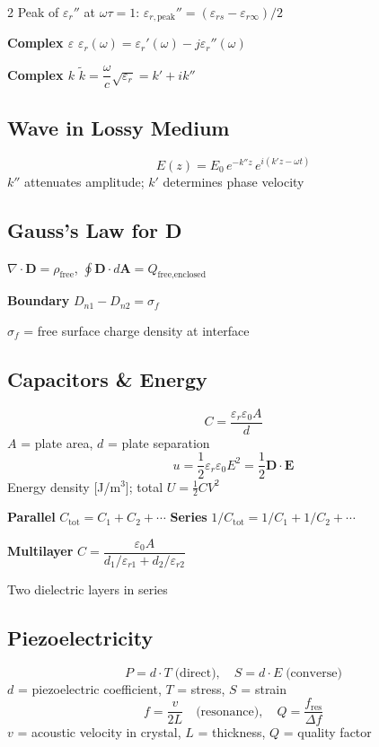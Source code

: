 \documentclass[9pt]{extarticle}
\newcommand{\eqlabel}[1]{\textbf{\scriptsize #1}\;}
\newcommand{\desc}[1]{{\small\color{desc}#1}}
\begin{document}
\begin{multicols}{2}
\desc{Peak of $\varepsilon_r''$ at $\omega\tau = 1$: \; $\varepsilon_{r,\text{peak}}'' = (\varepsilon_{rs}-\varepsilon_{r\infty})/2$}

\eqlabel{Complex $\varepsilon$} $\varepsilon_r(\omega) = \varepsilon_r'(\omega) - j\varepsilon_r''(\omega)$

\eqlabel{Complex $k$} $\tilde{k} = \dfrac{\omega}{c}\sqrt{\varepsilon_r} = k' + ik''$

\subsection{Wave in Lossy Medium}
\[E(z) = E_0\,e^{-k''z}\,e^{i(k'z-\omega t)}\]
\desc{$k''$ attenuates amplitude; $k'$ determines phase velocity}

\subsection{Gauss's Law for D}
$\nabla\cdot\mathbf{D} = \rho_{\text{free}}$, \quad $\displaystyle\oint\mathbf{D}\cdot d\mathbf{A} = Q_{\text{free,enclosed}}$

\eqlabel{Boundary} $D_{n1} - D_{n2} = \sigma_f$

\desc{$\sigma_f$ = free surface charge density at interface}

\subsection{Capacitors \& Energy}
\[C = \frac{\varepsilon_r\varepsilon_0 A}{d}\]
\desc{$A$ = plate area, $d$ = plate separation}
\[u = \frac{1}{2}\varepsilon_r\varepsilon_0 E^2 = \frac{1}{2}\mathbf{D}\cdot\mathbf{E}\]
\desc{Energy density [J/m$^3$]; total $U = \tfrac{1}{2}CV^2$}

\eqlabel{Parallel} $C_{\text{tot}} = C_1 + C_2 + \cdots$
\quad
\eqlabel{Series} $1/C_{\text{tot}} = 1/C_1 + 1/C_2 + \cdots$

\eqlabel{Multilayer} $C = \dfrac{\varepsilon_0 A}{d_1/\varepsilon_{r1} + d_2/\varepsilon_{r2}}$

\desc{Two dielectric layers in series}

\subsection{Piezoelectricity}
\[P = d\cdot T \;\text{(direct)},\quad S = d\cdot E \;\text{(converse)}\]
\desc{$d$ = piezoelectric coefficient, $T$ = stress, $S$ = strain}
\[f = \frac{v}{2L} \quad\text{(resonance)},\quad Q = \frac{f_{\text{res}}}{\Delta f}\]
\desc{$v$ = acoustic velocity in crystal, $L$ = thickness, $Q$ = quality factor}


\end{multicols}
\end{document}
